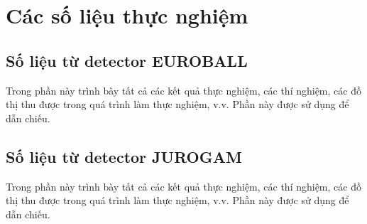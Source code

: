 \chapter{Các số liệu thực nghiệm}
\label{phuluc:solieuthucnghiem}

\section{Số liệu từ detector EUROBALL} 
Trong phần này trình bày tất cả các kết quả thực nghiệm, các thí nghiệm, các đồ thị thu được trong quá trình làm thực nghiệm, v.v. Phần này được sử dụng để dẫn chiếu.

\section{Số liệu từ detector JUROGAM}
Trong phần này trình bày tất cả các kết quả thực nghiệm, các thí nghiệm, các đồ thị thu được trong quá trình làm thực nghiệm, v.v. Phần này được sử dụng để dẫn chiếu.